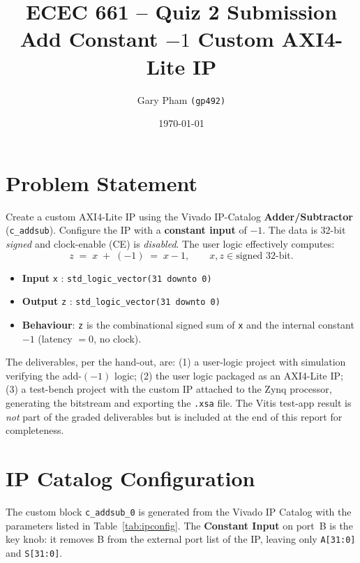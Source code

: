 \documentclass[11pt,letterpaper]{article}
\title{\textbf{ECEC 661 -- Quiz 2 Submission}\\
       \large Add Constant $-1$ Custom AXI4-Lite IP}
\author{Gary Pham \texttt{(gp492)}}
\date{\today}
\begin{document}
\maketitle

\section{Problem Statement}

Create a custom AXI4-Lite IP using the Vivado IP-Catalog
\textbf{Adder/Subtractor} (\texttt{c\_addsub}). Configure the IP with a
\textbf{constant input} of $-1$. The data is 32-bit \emph{signed} and
clock-enable (CE) is \emph{disabled}. The user logic effectively computes:
\[
    z \;=\; x \;+\; (-1) \;=\; x - 1, \qquad x,z \in \text{signed 32-bit}.
\]

\begin{itemize}
    \item \textbf{Input} \texttt{x} : \texttt{std\_logic\_vector(31 downto 0)}
    \item \textbf{Output} \texttt{z} : \texttt{std\_logic\_vector(31 downto 0)}
    \item \textbf{Behaviour}: \texttt{z} is the combinational signed sum
          of \texttt{x} and the internal constant $-1$ (latency $= 0$,
          no clock).
\end{itemize}

The deliverables, per the hand-out, are: (1) a user-logic project with
simulation verifying the add-$(-1)$ logic; (2) the user logic packaged as
an AXI4-Lite IP; (3) a test-bench project with the custom IP attached to
the Zynq processor, generating the bitstream and exporting the
\texttt{.xsa} file. The Vitis test-app result is \emph{not} part of the
graded deliverables but is included at the end of this report for
completeness.

\section{IP Catalog Configuration}

The custom block \texttt{c\_addsub\_0} is generated from the Vivado IP
Catalog with the parameters listed in Table~\ref{tab:ipconfig}. The
\textbf{Constant Input} on port~B is the key knob: it removes B from the
external port list of the IP, leaving only \texttt{A[31:0]} and
\texttt{S[31:0]}.
\end{document}
